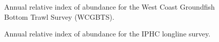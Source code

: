 \documentclass[
]{scrartcl}
\begin{document}
\begin{figure}


\caption{\label{fig-wcgbtsindex}Annual relative index of abundance for
the West Coast Groundfish Bottom Trawl Survey (WCGBTS).}

\end{figure}%

\begin{figure}


\caption{\label{fig-IPHC_index}Annual relative index of abundance for
the IPHC longline survey.}

\end{figure}%
\end{document}
